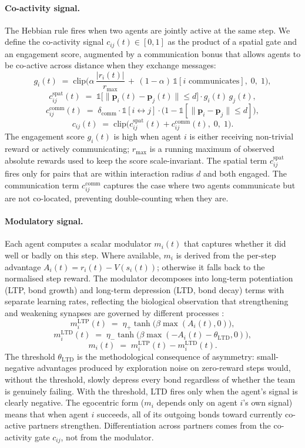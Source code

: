 \paragraph{Co-activity signal.}
The Hebbian rule fires when two agents are jointly active at the same step. We define the co-activity signal $c_{ij}(t) \in [0, 1]$ as the product of a spatial gate and an engagement score, augmented by a communication bonus that allows agents to be co-active across distance when they exchange messages:
\[
g_i(t) \;=\; \mathrm{clip}\!\Big(\alpha \, \frac{|r_i(t)|}{r_{\max}} \,+\, (1 - \alpha) \, \mathds{1}[i \text{ communicates}],\; 0,\; 1\Big),
\]
\[
c^{\text{spat}}_{ij}(t) \;=\; \mathds{1}\!\big[\|\mathbf{p}_i(t) - \mathbf{p}_j(t)\| \le d\big] \cdot g_i(t) \, g_j(t),
\]
\[
c^{\text{comm}}_{ij}(t) \;=\; \delta_{\text{comm}} \cdot \mathds{1}[i \leftrightarrow j] \cdot \big(1 - \mathds{1}[\|\mathbf{p}_i - \mathbf{p}_j\| \le d]\big),
\]
\[
c_{ij}(t) \;=\; \mathrm{clip}\!\big(c^{\text{spat}}_{ij}(t) + c^{\text{comm}}_{ij}(t),\; 0,\; 1\big).
\]
The engagement score $g_i(t)$ is high when agent $i$ is either receiving non-trivial reward or actively communicating; $r_{\max}$ is a running maximum of observed absolute rewards used to keep the score scale-invariant. The spatial term $c^{\text{spat}}_{ij}$ fires only for pairs that are within interaction radius $d$ and both engaged. The communication term $c^{\text{comm}}_{ij}$ captures the case where two agents communicate but are not co-located, preventing double-counting when they are.

\paragraph{Modulatory signal.}
Each agent computes a scalar modulator $m_i(t)$ that captures whether it
did well or badly on this step. Where available, $m_i$ is derived from the
per-step advantage $A_i(t) = r_i(t) - V(s_i(t))$; otherwise it falls back
to the normalised step reward. The modulator decomposes into long-term
potentiation (LTP, bond growth) and long-term depression (LTD, bond decay)
terms with separate learning rates, reflecting the biological observation
that strengthening and weakening synapses are governed by different
processes \cite{lazari2022hebbian}:
\[
m^{\text{LTP}}_i(t) \;=\; \eta_+ \tanh\!\big(\beta \max(A_i(t), 0)\big),
\]
\[
m^{\text{LTD}}_i(t) \;=\; \eta_- \tanh\!\big(\beta \max(-A_i(t) - \theta_{\text{LTD}}, 0)\big),
\]
\[
m_i(t) \;=\; m^{\text{LTP}}_i(t) - m^{\text{LTD}}_i(t).
\]
The threshold $\theta_{\text{LTD}}$ is the methodological consequence of asymmetry: small-negative advantages produced by exploration noise on zero-reward steps would, without the threshold, slowly depress every bond regardless of whether the team is genuinely failing. With the threshold, LTD fires only when the agent's signal is clearly negative. The egocentric form ($m_i$ depends only on agent $i$'s own signal) means that when agent $i$ succeeds, all of its outgoing bonds toward currently co-active partners strengthen. Differentiation across partners comes from the co-activity gate $c_{ij}$, not from the modulator.

